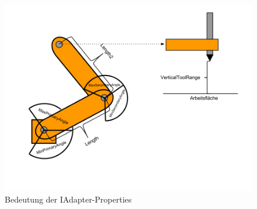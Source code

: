 \begin{figure}[H]
  \centering
  \begin{minipage}[t]{12 cm}
  	\centering
  	\includegraphics[width=12cm]{images/AdapterProperties} 
    \caption{Bedeutung der IAdapter-Properties}
  \end{minipage}
\end{figure}

